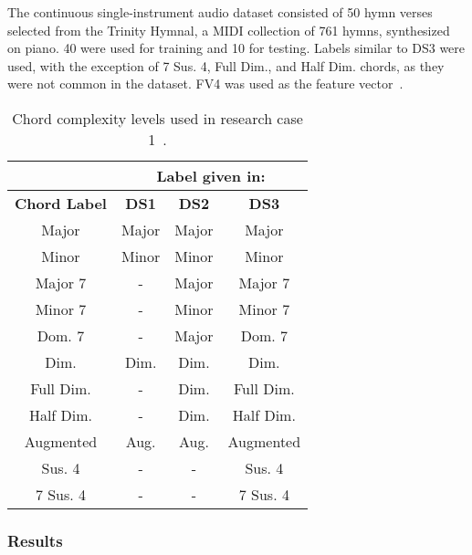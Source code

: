 \documentclass{sig-alternate}
\begin{document}

The continuous single-instrument audio dataset consisted of 50 hymn verses selected from the Trinity Hymnal, a MIDI collection of 761 hymns, synthesized on piano. 40 were used for training and 10 for testing. Labels similar to DS3 were used, with the exception of 7 Sus. 4, Full Dim., and Half Dim. chords, as they were not common in the dataset. FV4 was used as the feature vector~\cite{Morman:2006}. 



\begin{table}
\centering
\begin{tabular}{|c|c|c|c|} \hline
&\multicolumn{3}{|c|}{\textbf{Label given in:}} \\ \hline
\textbf{Chord Label} & \textbf{DS1} & \textbf{DS2} & \textbf{DS3} \\ \hline
Major & Major & Major & Major \\ \hline
Minor & Minor & Minor & Minor \\ \hline
Major 7 & - & Major & Major 7 \\ \hline
Minor 7 & - & Minor & Minor 7 \\ \hline
Dom. 7 & - & Major & Dom. 7 \\ \hline
Dim. & Dim. & Dim. & Dim. \\ \hline
Full Dim. & - & Dim. & Full Dim. \\ \hline
Half Dim. & - & Dim. & Half Dim. \\ \hline
Augmented & Aug. & Aug. & Augmented \\ \hline
Sus. 4 & - & - & Sus. 4 \\ \hline
7 Sus. 4 & - & - & 7 Sus. 4 \\ \hline
\end{tabular}
\caption{Chord complexity levels used in research case 1~\cite{Morman:2006}.}
\label{tab:tab1}
\end{table} 

\subsubsection{Results}
\end{document}
